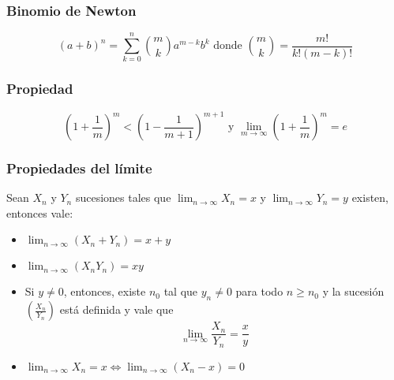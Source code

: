 \subsubsection{Binomio de Newton}
\begin{equation*}
(a+b)^n = \sum_{k = 0}^n\binom{m}{k}a^{m-k}b^k \text{ donde } \binom{m}{k} = \frac{m!}{k!(m-k)!}
\end{equation*}

\subsubsection{Propiedad}
\begin{equation*}
\left( 1 + \frac{1}{m}\right)^m < \left(1 - \frac{1}{m+1}\right)^{m+1} \text{ y } \lim_{m\to\infty} \left( 1 + \frac{1}{m}\right)^m = e 
\end{equation*}

\subsubsection{Propiedades del límite}
Sean $X_n$ y $Y_n$ sucesiones tales que $\lim_{n\to\infty} X_n = x$ y $\lim_{n\to\infty} Y_n = y$ existen, entonces vale:

\begin{itemize}
\item $\lim_{n\to\infty}\limits(X_n + Y_n) = x + y$
\item $\lim_{n\to\infty}\limits(X_nY_n) = xy$
\item Si $y\neq0$, entonces, existe $n_0$ tal que  $y_{n}\neq 0$ para todo $n\geq n_0$ y la sucesión $\left(\frac{X_n}{Y_n}\right)$ está definida y vale que
\begin{equation*}
\lim_{n\to\infty} \frac{X_n}{Y_n} = \frac{x}{y}
\end{equation*}
\item $\lim_{n\to\infty}\limits X_n = x \iff \lim_{n\to\infty}\limits (X_n - x) = 0 $
\end{itemize}

